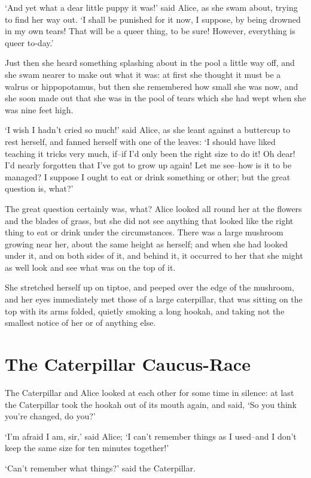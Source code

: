 \documentclass[statementpaper,twoside,openany]{memoir}
\begin{document}
`And yet what a dear little puppy it was!' said Alice, as she swam about, trying to find her way out. `I shall be punished for it now, I suppose, by being drowned in my own tears! That will be a queer thing, to be sure! However, everything is queer to-day.'

Just then she heard something splashing about in the pool a little way off, and she swam nearer to make out what it was: at first she thought it must be a walrus or hippopotamus, but then she remembered how small she was now, and she soon made out that she was in the pool of tears which she had wept when she was nine feet high.

`I wish I hadn't cried so much!' said Alice, as she leant against a buttercup to rest herself, and fanned herself with one of the leaves: `I should have liked teaching it tricks very much, if--if I'd only been the right size to do it! Oh dear! I'd nearly forgotten that I've got to grow up again! Let me see--how is it to be managed? I suppose I ought to eat or drink something or other; but the great question is, what?'

The great question certainly was, what? Alice looked all round her at the flowers and the blades of grass, but she did not see anything that looked like the right thing to eat or drink under the circumstances. There was a large mushroom growing near her, about the same height as herself; and when she had looked under it, and on both sides of it, and behind it, it occurred to her that she might as well look and see what was on the top of it.

She stretched herself up on tiptoe, and peeped over the edge of the mushroom, and her eyes immediately met those of a large caterpillar, that was sitting on the top with its arms folded, quietly smoking a long hookah, and taking not the smallest notice of her or of anything else.

\chapter{The Caterpillar Caucus-Race}

The Caterpillar and Alice looked at each other for some time in silence: at last the Caterpillar took the hookah out of its mouth again, and said, `So you think you're changed, do you?'

`I'm afraid I am, sir,' said Alice; `I can't remember things as I used--and I don't keep the same size for ten minutes together!'

`Can't remember what things?' said the Caterpillar.
\end{document}
